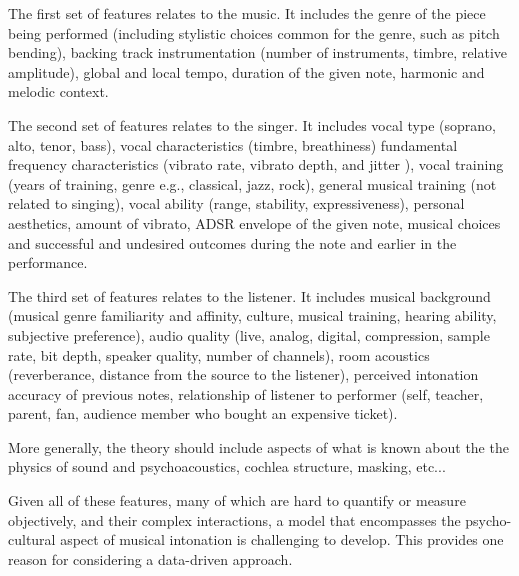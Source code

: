 The first set of features relates to the music. It includes the genre of the piece being performed (including stylistic choices common for the genre, such as pitch bending), backing track instrumentation (number of instruments, timbre, relative amplitude), global and local tempo, duration of the given note, harmonic and melodic context.

The second set of features relates to the singer. It includes vocal type (soprano, alto, tenor, bass), vocal characteristics (timbre, breathiness) fundamental frequency characteristics (vibrato rate, vibrato depth, and jitter \cite{devaney2020new}), vocal training (years of training, genre e.g., classical, jazz, rock), general musical training (not related to singing), vocal ability (range, stability, expressiveness), personal aesthetics, amount of vibrato, ADSR envelope of the given note, musical choices and successful and undesired outcomes during the note and earlier in the performance.

The third set of features relates to the listener. It includes musical background (musical genre familiarity and affinity, culture, musical training, hearing ability, subjective preference), audio quality (live, analog, digital, compression, sample rate, bit depth, speaker quality, number of channels), room acoustics (reverberance, distance from the source to the listener), perceived intonation accuracy of previous notes, relationship of listener to performer (self, teacher, parent, fan, audience member who bought an expensive ticket).

More generally, the theory should include aspects of what is known about the the physics of sound and psychoacoustics, cochlea structure, masking, etc...

Given all of these features, many of which are hard to quantify or measure objectively, and their complex interactions, a model that encompasses the psycho-cultural aspect of musical intonation is challenging to develop. This provides one reason for considering a data-driven approach.

